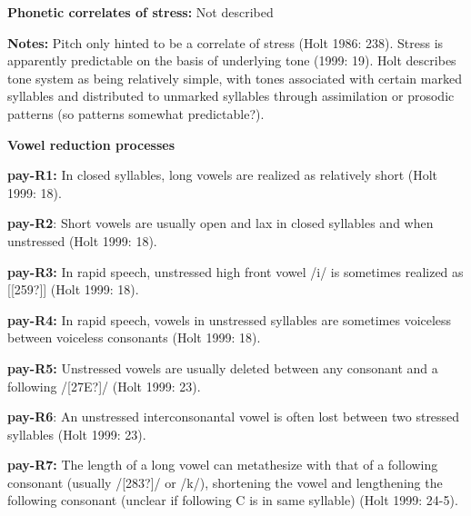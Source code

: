 \begin{styleBody}
\textbf{Phonetic correlates of stress: }Not described
\end{styleBody}

\begin{styleBody}
\textbf{Notes:} Pitch only hinted to be a correlate of stress (Holt 1986: 238). Stress is apparently predictable on the basis of underlying tone (1999: 19). Holt describes tone system as being relatively simple, with tones associated with certain marked syllables and distributed to unmarked syllables through assimilation or prosodic patterns (so patterns somewhat predictable?).
\end{styleBody}

\begin{styleBody}
\textbf{Vowel reduction processes}
\end{styleBody}

\begin{styleBody}
\textbf{pay-R1:} In closed syllables, long vowels are realized as relatively short (Holt 1999: 18).
\end{styleBody}

\begin{styleBody}
\textbf{pay-R2}: Short vowels are usually open and lax in closed syllables and when unstressed (Holt 1999: 18).
\end{styleBody}

\begin{styleBody}
\textbf{pay-R3: }In rapid speech, unstressed high front vowel /i/ is sometimes realized as [[259?]] (Holt 1999: 18).
\end{styleBody}

\begin{styleBody}
\textbf{pay-R4:} In rapid speech, vowels in unstressed syllables are sometimes voiceless between voiceless consonants (Holt 1999: 18).
\end{styleBody}

\begin{styleBody}
\textbf{pay-R5:} Unstressed vowels are usually deleted between any consonant and a following /[27E?]/ (Holt 1999: 23).
\end{styleBody}

\begin{styleBody}
\textbf{pay-R6}: An unstressed interconsonantal vowel is often lost between two stressed syllables (Holt 1999: 23).
\end{styleBody}

\begin{styleBody}
\textbf{pay-R7:} The length of a long vowel can metathesize with that of a following consonant (usually /[283?]/ or /k/), shortening the vowel and lengthening the following consonant (unclear if following C is in same syllable) (Holt 1999: 24-5).
\end{styleBody}

